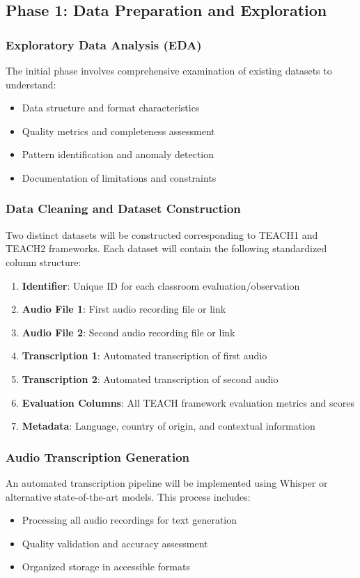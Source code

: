 \documentclass[12pt]{article}
\begin{document}
\subsection{Phase 1: Data Preparation and Exploration}

\subsubsection{Exploratory Data Analysis (EDA)}
The initial phase involves comprehensive examination of existing datasets to understand:
\begin{itemize}
    \item Data structure and format characteristics
    \item Quality metrics and completeness assessment
    \item Pattern identification and anomaly detection
    \item Documentation of limitations and constraints
\end{itemize}

\subsubsection{Data Cleaning and Dataset Construction}
Two distinct datasets will be constructed corresponding to TEACH1 and TEACH2 frameworks. Each dataset will contain the following standardized column structure:

\begin{enumerate}
    \item \textbf{Identifier}: Unique ID for each classroom evaluation/observation
    \item \textbf{Audio File 1}: First audio recording file or link
    \item \textbf{Audio File 2}: Second audio recording file or link  
    \item \textbf{Transcription 1}: Automated transcription of first audio
    \item \textbf{Transcription 2}: Automated transcription of second audio
    \item \textbf{Evaluation Columns}: All TEACH framework evaluation metrics and scores
    \item \textbf{Metadata}: Language, country of origin, and contextual information
\end{enumerate}

\subsubsection{Audio Transcription Generation}
An automated transcription pipeline will be implemented using Whisper or alternative state-of-the-art models. This process includes:
\begin{itemize}
    \item Processing all audio recordings for text generation
    \item Quality validation and accuracy assessment
    \item Organized storage in accessible formats
\end{itemize}
\end{document}

